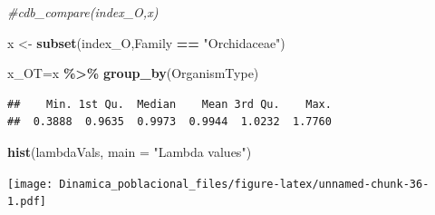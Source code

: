 \documentclass[
]{book}
\newenvironment{Shaded}{\begin{snugshade}}{\end{snugshade}}
\newcommand{\AttributeTok}[1]{\textcolor[rgb]{0.13,0.29,0.53}{#1}}
\newcommand{\CommentTok}[1]{\textcolor[rgb]{0.56,0.35,0.01}{\textit{#1}}}
\newcommand{\ConstantTok}[1]{\textcolor[rgb]{0.56,0.35,0.01}{#1}}
\newcommand{\FunctionTok}[1]{\textcolor[rgb]{0.13,0.29,0.53}{\textbf{#1}}}
\newcommand{\NormalTok}[1]{#1}
\newcommand{\OtherTok}[1]{\textcolor[rgb]{0.56,0.35,0.01}{#1}}
\newcommand{\SpecialCharTok}[1]{\textcolor[rgb]{0.81,0.36,0.00}{\textbf{#1}}}
\newcommand{\StringTok}[1]{\textcolor[rgb]{0.31,0.60,0.02}{#1}}
\theoremstyle{definition}
\theoremstyle{definition}
\theoremstyle{definition}
\theoremstyle{definition}
\theoremstyle{remark}
\begin{document}
\begin{Shaded}
\begin{Highlighting}[]
\CommentTok{\#cdb\_compare(index\_O,x)}


\NormalTok{x }\OtherTok{\textless{}{-}} \FunctionTok{subset}\NormalTok{(index\_O,Family }\SpecialCharTok{==} \StringTok{"Orchidaceae"}\NormalTok{)}

\NormalTok{x\_OT}\OtherTok{=}\NormalTok{x }\SpecialCharTok{\%\textgreater{}\%} 
  \FunctionTok{group\_by}\NormalTok{(OrganismType)}
\end{Highlighting}
\end{Shaded}

\begin{Shaded}
\end{Shaded}

\begin{verbatim}
##    Min. 1st Qu.  Median    Mean 3rd Qu.    Max. 
##  0.3888  0.9635  0.9973  0.9944  1.0232  1.7760
\end{verbatim}

\begin{Shaded}
\begin{Highlighting}[]
\FunctionTok{hist}\NormalTok{(lambdaVals, }\AttributeTok{main =} \StringTok{"Lambda values"}\NormalTok{)}
\end{Highlighting}
\end{Shaded}

\texttt{[image: Dinamica\_poblacional\_files/figure-latex/unnamed-chunk-36-1.pdf]}
\end{document}
